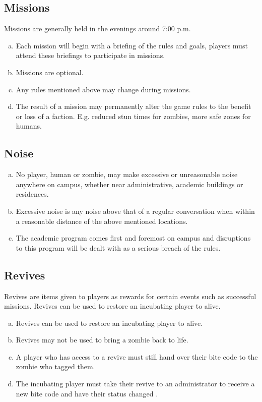 \documentclass[a4paper,12pt]{article}
\begin{document}
\subsection{Missions}
Missions are generally held in the evenings around 7:00  p.m.
\begin{enumerate}[(a)]
	\item Each mission will begin with a briefing of the rules and goals, players must attend these briefings to participate in missions.
	\item Missions are optional.
	\item Any rules mentioned above may change during missions.
	\item The result of a mission may permanently alter the game rules to the benefit or loss of a faction. E.g. reduced stun times for zombies, more safe zones for humans.
\end{enumerate}

\subsection{Noise}
\begin{enumerate}[(a)]
	\item No player, human or zombie, may make excessive or unreasonable noise anywhere on campus, whether near administrative, academic buildings or residences.
	\item Excessive noise is any noise above that of a regular conversation when within a reasonable distance of the above mentioned locations.
    \item The academic program comes first and foremost on campus and disruptions to this program will be dealt with as a serious breach of the rules.
\end{enumerate}

\subsection{Revives}
Revives are items given to players as rewards for certain events such as successful missions. Revives can be used to restore an incubating player to alive.
\begin{enumerate}[(a)]
	\item Revives can be used to restore an incubating player to alive.
	\item Revives may not be used to bring a zombie back to life.
	\item A player who has access to a revive must still hand over their bite code to the zombie who tagged them.
	\item The incubating player must take their revive to an administrator to receive a new bite code and have their status changed .

\end{enumerate}
\end{document}
